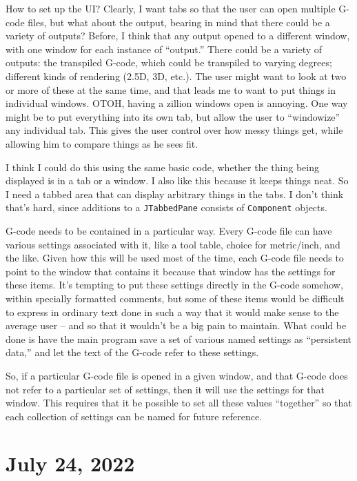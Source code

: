 \documentclass{article}
\begin{document}
How to set up the UI? Clearly, I want tabs so that the user can open
multiple G-code files, but what about the output, bearing in mind that
there could be a variety of outputs? Before, I think that any output
opened to a different window, with one window for each instance of
``output.'' There could be a variety of outputs: the transpiled
G-code, which could be transpiled to varying degrees; different kinds
of rendering (2.5D, 3D, etc.). The user might want to look at two or
more of these at the same time, and that leads me to want to put
things in individual windows. OTOH, having a zillion windows open is
annoying. One way might be to put everything into its own tab, but
allow the user to ``windowize'' any individual tab. This gives the
user control over how messy things get, while allowing him to compare
things as he sees fit.

I think I could do this using the same basic code, whether the thing
being displayed is in a tab or a window. I also like this because it
keeps things neat. So I need a tabbed area that can display arbitrary
things in the tabs. I don't think that's hard, since additions to a
{\tt JTabbedPane} consists of {\tt Component} objects.

G-code needs to be contained in a particular way. Every G-code file
can have various settings associated with it, like a tool table,
choice for metric/inch, and the like. Given how this will be used most
of the time, each G-code file needs to point to the window that
contains it because that window has the settings for these items. It's
tempting to put these settings directly in the G-code somehow, within
specially formatted comments, but some of these items would be
difficult to express in ordinary text done in such a way that it would
make sense to the average user -- and so that it wouldn't be a big
pain to maintain. What could be done is have the main program save a
set of various named settings as ``persistent data,'' and let the text
of the G-code refer to these settings.

So, if a particular G-code file is opened in a given window, and that
G-code does not refer to a particular set of settings, then it will
use the settings for that window. This requires that it be possible to
set all these values ``together'' so that each collection of settings
can be named for future reference.

\section{July 24, 2022}
\end{document}
